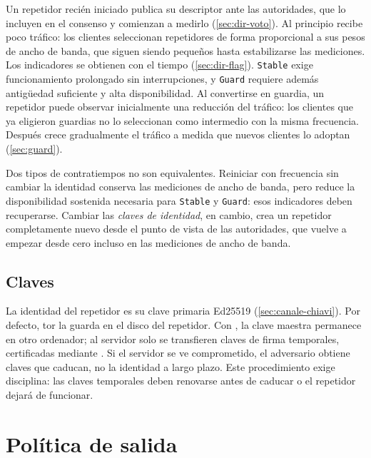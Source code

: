 Un repetidor recién iniciado publica su descriptor ante las autoridades, que lo incluyen en el consenso y comienzan a medirlo (\cref{sec:dir-voto}). Al principio recibe poco tráfico: los clientes seleccionan repetidores de forma proporcional a sus pesos de ancho de banda, que siguen siendo pequeños hasta estabilizarse las mediciones. Los indicadores se obtienen con el tiempo (\cref{sec:dir-flag}). \texttt{Stable} exige funcionamiento prolongado sin interrupciones, y \texttt{Guard} requiere además antigüedad suficiente y alta disponibilidad. Al convertirse en guardia, un repetidor puede observar inicialmente una reducción del tráfico: los clientes que ya eligieron guardias no lo seleccionan como intermedio con la misma frecuencia. Después crece gradualmente el tráfico a medida que nuevos clientes lo adoptan (\cref{sec:guard}).

Dos tipos de contratiempos no son equivalentes. Reiniciar con frecuencia sin cambiar la identidad conserva las mediciones de ancho de banda, pero reduce la disponibilidad sostenida necesaria para \texttt{Stable} y \texttt{Guard}: esos indicadores deben recuperarse. Cambiar las \emph{claves de identidad}, en cambio, crea un repetidor completamente nuevo desde el punto de vista de las autoridades, que vuelve a empezar desde cero incluso en las mediciones de ancho de banda.

\subsection{Claves}

La identidad del repetidor es su clave primaria Ed25519 (\cref{sec:canale-chiavi}). Por defecto, tor la guarda en el disco del repetidor. Con , la clave maestra permanece en otro ordenador; al servidor solo se transfieren claves de firma temporales, certificadas mediante . Si el servidor se ve comprometido, el adversario obtiene claves que caducan, no la identidad a largo plazo. Este procedimiento exige disciplina: las claves temporales deben renovarse antes de caducar o el repetidor dejará de funcionar.

\section{Política de salida}\label{sec:relay-exitpolicy}

